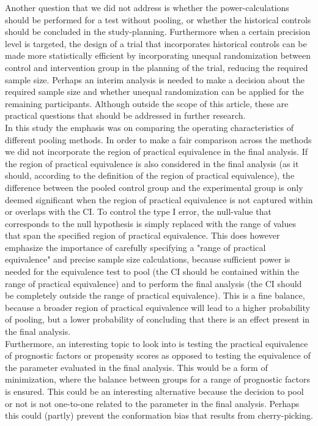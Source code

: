 \documentclass[Royal,sagev,times]{sagej}
\begin{document}
Another question that we did not address is whether the power-calculations should be performed for a test without pooling, or whether the historical controls should be concluded in the study-planning. Furthermore when a certain precision level is targeted, the design of a trial that incorporates historical controls can be made more statistically efficient by incorporating unequal randomization between control and intervention group in the planning of the trial, reducing the required sample size.\cite{dron2019} Perhaps an interim analysis is needed to make a decision about the required sample size and whether unequal randomization can be applied for the remaining participants. Although outside the scope of this article, these are practical questions that should be addressed in further research. \\

In this study the emphasis was on comparing the operating characteristics of different pooling methods. In order to make a fair comparison across the methods we did not incorporate the region of practical equivalence in the final analysis. If the region of practical equivalence is also considered in the final analysis (as it should, according to the definition of the region of practical equivalence), the difference between the pooled control group and the experimental group is only deemed significant when the region of practical equivalence is not captured within or overlaps with the CI. To control the type I error, the null-value that corresponds to the null hypothesis is simply replaced with the range of values that span the specified region of practical equivalence. This does however emphasize the importance of carefully specifying a "range of practical equivalence" and precise sample size calculations, because sufficient power is needed for the equivalence test to pool (the CI should be contained within the range of practical equivalence) and to perform the final analysis (the CI should be completely outside the range of practical equivalence). This is a fine balance, because a broader region of practical equivalence will lead to a higher probability of pooling, but a lower probability of concluding that there is an effect present in the final analysis. \\

Furthermore, an interesting topic to look into is testing the practical equivalence of prognostic factors or propensity scores as opposed to testing the equivalence of the parameter evaluated in the final analysis. This would be a form of minimization, where the balance between groups for a range of prognostic factors is ensured.\cite{chio2009} This could be an interesting alternative because the decision to pool or not is not one-to-one related to the parameter in the final analysis. Perhaps this could (partly) prevent the conformation bias that results from cherry-picking.\\
\end{document}
